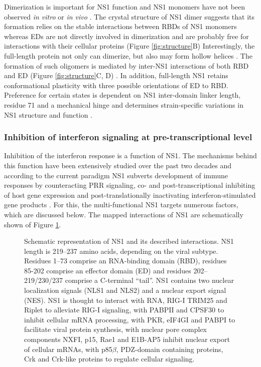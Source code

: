 		Dimerization is important for \gls{NS1} function and \gls{NS1} monomers have not been observed \textit{in vitro} or \textit{in vivo} \parencite{Hale2014}. The crystal structure of NS1 dimer suggests that its formation relies on the stable interactions between \glspl{RBD} of NS1 monomers whereas \glspl{ED} are not directly involved in dimerization and are probably free for interactions with their cellular proteins (Figure \ref{fig:structure}B) \parencite{Bornholdt2008} Interestingly, the full-length protein not only can dimerize, but also may form hollow helices \parencite{Bornholdt2008}. The formation of such oligomers is mediated by inter-NS1 interactions of both \gls{RBD} and \gls{ED} (Figure \ref{fig:structure}C, D) \parencite{Bornholdt2008, Carrillo2014}. In addition, full-length \gls{NS1} retains conformational plasticity with three possible orientations of \gls{ED} to \gls{RBD}. Preference for certain states is dependent on \gls{NS1} inter-domain linker length, residue 71 and a mechanical hinge and determines strain-specific variations in \gls{NS1} structure and function \parencite{Carrillo2014}. 
		
	
		\subsubsection{Inhibition of interferon signaling at pre-transcriptional level} \label{sec:pre-transcriptional}
		
		Inhibition of the interferon response is a function of NS1. The mechanisms behind this function have been extensively studied over the past two decades and according to the current paradigm NS1 subverts development of immune responses by counteracting PRR signaling, co- and post-transcriptional inhibiting of host gene expression and post-translationally inactivating  interferon-stimulated gene products \parencite{Ayllon2014}.	For this, the multi-functional NS1 targets numerous factors, which are discussed below. The mapped interactions of NS1 are schematically shown of Figure \ref{fig:NS1}.
		
		\begin{figure}[h]
			\centering
			\caption{Schematic representation of NS1 and its described interactions. NS1 length is 219--237 amino acids, depending on the viral subtype. Residues 1--73 comprise an RNA-binding domain (RBD), residues 85-202 comprise an effector domain (ED) and residues 202--219/230/237 comprise a C-terminal ``tail''. NS1 contains two nuclear localization signals (NLS1 and NLS2) and a nuclear export signal (NES). NS1 is thought to interact with RNA, RIG-I TRIM25 and Riplet to alleviate RIG-I signaling, with PABPII and CPSF30 to inhibit cellular mRNA processing, with PKR, eIF4GI and PABPI to facilitate viral protein synthesis, with nuclear pore complex components NXFI, p15, Rae1 and E1B-AP5 inhibit nuclear export of cellular mRNAs, with p85$\beta$, PDZ-domain containing proteins, Crk and Crk-like proteins to regulate cellular signaling.} \label{fig:NS1}
		\end{figure}
				
